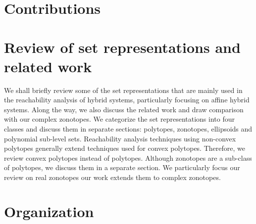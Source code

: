 

\section{Contributions}


\section{Review of set representations and related work}
We shall briefly review some of the set representations that are
mainly used in the reachability analysis of hybrid systems,
particularly focusing on affine hybrid systems.  Along the way, we
also discuss the related work and draw comparison with our complex
zonotopes.  We categorize the set representations into four classes
and discuss them in separate sections: polytopes, zonotopes,
ellipsoids and polynomial sub-level sets.  Reachability analysis
techniques using non-convex polytopes generally extend techniques used
for convex polytopes.  Therefore, we review convex polytopes instead
of polytopes.  Although zonotopes are a sub-class of polytopes, we
discuss them in a separate section.  We particularly focus our review
on real zonotopes our work extends them to complex zonotopes.
%


\section{Organization}


